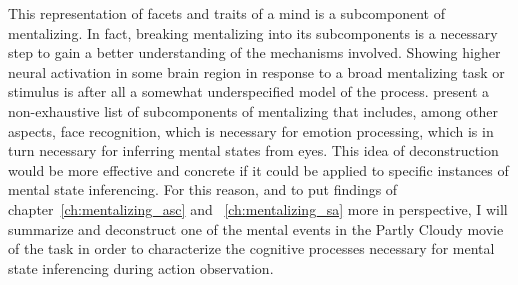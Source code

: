 This representation of facets and traits of a mind is a subcomponent of mentalizing. In fact, breaking mentalizing into its subcomponents \citep["deconstructing" it;][]{schaafsma2015} is a necessary step to gain a better understanding of the mechanisms involved. Showing higher neural activation in some brain region in response to a broad mentalizing task or stimulus is after all a somewhat underspecified model of the process. \cite{schaafsma2015} present a non-exhaustive list of subcomponents of mentalizing that includes, among other aspects, face recognition, which is necessary for emotion processing, which is in turn necessary for inferring mental states from eyes. This idea of deconstruction would be more effective and concrete if it could be applied to specific instances of mental state inferencing. For this reason, and to put findings of chapter~\ref{ch:mentalizing_asc} and ~\ref{ch:mentalizing_sa} more in perspective, I will summarize and deconstruct one of the mental events in the Partly Cloudy movie of the task in order to characterize the cognitive processes necessary for mental state inferencing during action observation.  

